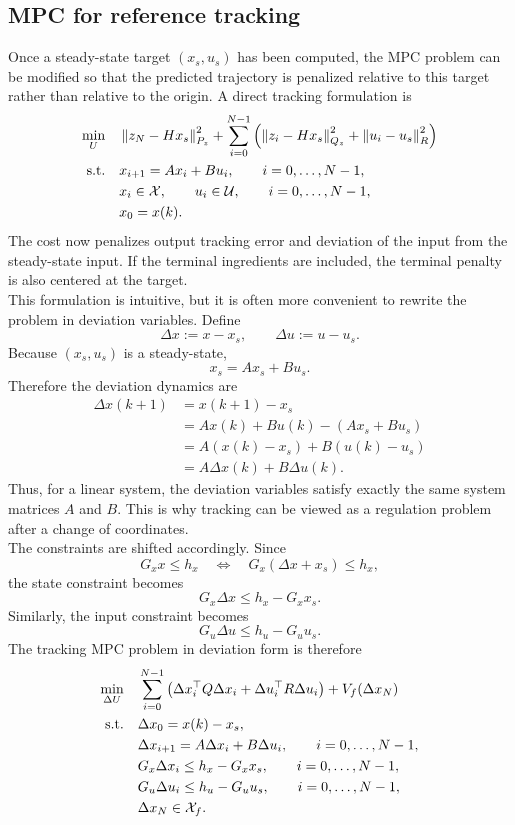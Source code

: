 \subsection{MPC for reference tracking}

Once a steady-state target \((x_s,u_s)\) has been computed, the MPC problem can be modified
so that the predicted trajectory is penalized relative to this target rather than relative to the
origin. A direct tracking formulation is
\[
\begin{aligned}
    \min_{U} \quad &
    \left\lVert z_N - Hx_s \right\rVert_{P_z}^2
    +
    \sum_{i=0}^{N-1}
    \left(
        \left\lVert z_i-Hx_s \right\rVert_{Q_z}^2
        +
        \left\lVert u_i-u_s \right\rVert_{R}^2
    \right) \\
    \text{s.t.} \quad &
    x_{i+1}=Ax_i+Bu_i,\qquad i=0,\dots,N-1,\\
    & x_i\in\mathcal{X},\qquad u_i\in\mathcal{U},\qquad i=0,\dots,N-1,\\
    & x_0=x(k).
\end{aligned}
\]
The cost now penalizes output tracking error and deviation of the input from the steady-state
input. If the terminal ingredients are included, the terminal penalty is also centered at the
target.\\
This formulation is intuitive, but it is often more convenient to rewrite the problem in
deviation variables. Define
\[
    \Delta x := x-x_s,\qquad \Delta u := u-u_s.
\]
Because \((x_s,u_s)\) is a steady-state,
\[
    x_s = Ax_s + Bu_s.
\]
Therefore the deviation dynamics are
\[
\begin{aligned}
    \Delta x(k+1)
    &= x(k+1)-x_s \\
    &= Ax(k)+Bu(k)-(Ax_s+Bu_s)\\
    &= A(x(k)-x_s)+B(u(k)-u_s)\\
    &= A\Delta x(k)+B\Delta u(k).
\end{aligned}
\]
Thus, for a linear system, the deviation variables satisfy exactly the same system matrices
\(A\) and \(B\). This is why tracking can be viewed as a regulation problem after a change of
coordinates.\\
The constraints are shifted accordingly. Since
\[
    G_x x \le h_x
    \quad \Longleftrightarrow \quad
    G_x(\Delta x+x_s)\le h_x,
\]
the state constraint becomes
\[
    G_x\Delta x \le h_x-G_xx_s.
\]
Similarly, the input constraint becomes
\[
    G_u\Delta u \le h_u-G_u u_s.
\]
The tracking MPC problem in deviation form is therefore
\[
\begin{aligned}
    \min_{\Delta U} \quad &
    \sum_{i=0}^{N-1}
    \left(
        \Delta x_i^\top Q\Delta x_i
        +
        \Delta u_i^\top R\Delta u_i
    \right)
    +
    V_f(\Delta x_N)\\
    \text{s.t.} \quad &
    \Delta x_0 = x(k)-x_s,\\
    & \Delta x_{i+1}=A\Delta x_i+B\Delta u_i,\qquad i=0,\dots,N-1,\\
    & G_x\Delta x_i \le h_x-G_xx_s,\qquad i=0,\dots,N-1,\\
    & G_u\Delta u_i \le h_u-G_u u_s,\qquad i=0,\dots,N-1,\\
    & \Delta x_N \in \mathcal{X}_f .
\end{aligned}
\]
